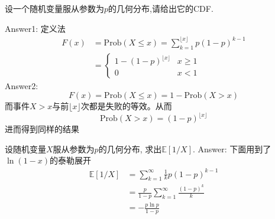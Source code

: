 \exer 设一个随机变量服从参数为$p$的几何分布,请给出它的CDF.\par
Answer1: 定义法
\begin{align*}
F(x)&=\mathrm{Prob}(X\le x)=\sum_{k=1}^{\lfloor x\rfloor}p(1-p)^{k-1} \\
&=\begin{cases}
1-(1-p)^{\lfloor x\rfloor}   & x \ge 1 \\
0 & x < 1
\end{cases}
\end{align*}
Answer2: 
\[F(x)=\mathrm{Prob}(X\le x)=1-\mathrm{Prob}(X>x)\]
而事件$X>x$与前$\lfloor x\rfloor$次都是失败的等效。从而
\[\mathrm{Prob}(X>x)=(1-p)^{\lfloor x\rfloor}\]
进而得到同样的结果

\exer 设随机变量$X$服从参数为$p$的几何分布, 求出$\mathbb{E}[1/X]$.
Answer: 下面用到了$\ln(1-x)$的泰勒展开
\begin{align*}
\mathbb{E}[1/X] &= \sum_{k=1}^\infty \frac{1}{k}p(1-p)^{k-1} \\
&=\frac{p}{1-p}\sum_{k=1}^\infty \frac{(1-p)^{k}}{k} \\
&=-\frac{p\ln p}{1-p}
\end{align*}
